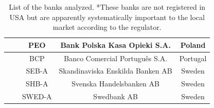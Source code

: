 \documentclass[12pt]{article}
\begin{document}
\begin{table}[!htbp]
\begin{center}
{\begin{tabular}{c|c||c |c|c}
			\hline
			& & PEO & Bank Polska Kasa Opieki S.A. & Poland \\
			\hline
			& & BCP & Banco Comercial Português S.A. & Portugal \\
			\hline
			& & SEB-A & Skandinaviska Enskilda Banken AB & Sweden \\
			\hline
			& & SHB-A & Svenska Handelsbanken AB & Sweden \\
			\hline
			& & SWED-A & Swedbank AB & Sweden
		\end{tabular}}
	\end{center}
	\caption{List of the banks analyzed. *These banks are not registered in USA but are apparently systematically important to the local market according to the regulator. }
	\label{table:bank_list}
\end{table}
\end{document}
